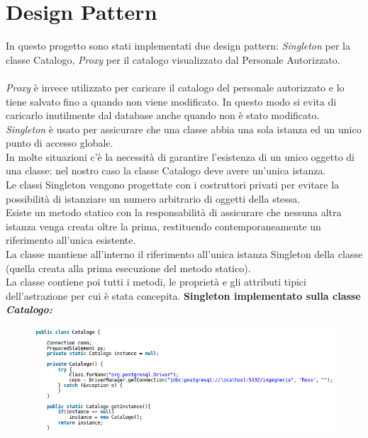 \documentclass[a4paper,12pt]{report}
\begin{document}
	\chapter*{Design Pattern}
	In questo progetto sono stati implementati due design pattern: \textit{Singleton} per la classe Catalogo, \textit{Proxy} per il catalogo visualizzato dal Personale Autorizzato.\\ \\
	\textit{Proxy} è invece utilizzato per caricare il catalogo del personale autorizzato e lo tiene salvato fino a quando non viene modificato. In questo modo si evita di caricarlo inutilmente dal database anche quando non è stato modificato.
	\\
	\newline
	\textit{Singleton} è usato per assicurare che una classe abbia una sola istanza ed un unico punto di accesso globale.\\
	In molte situazioni c’è la necessità di garantire l’esistenza di un unico oggetto di una classe: nel nostro caso la classe Catalogo deve avere un'unica istanza.\\
	Le classi Singleton vengono progettate con i costruttori privati per evitare la possibilità di istanziare un numero arbitrario di oggetti della stessa.\\
	Esiste un metodo statico con la responsabilità di assicurare che nessuna altra istanza venga creata oltre la prima, restituendo contemporaneamente un riferimento all’unica esistente.\\
	La classe mantiene all’interno il riferimento all’unica istanza Singleton della classe (quella creata alla prima esecuzione del metodo statico).\\
	La classe contiene poi tutti i metodi, le proprietà e gli attributi tipici dell’astrazione per cui è
	stata concepita.
	\newline
	\newline
	\newline
	\textbf{Singleton implementato sulla classe \textit{Catalogo:}}	
	\begin{figure}[h]
		\centering
		\includegraphics[width=\textwidth, height=4cm]{Singleton}
	\end{figure}
	
\end{document}
